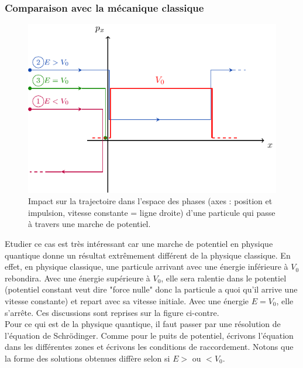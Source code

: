 \subsubsection{Comparaison avec la mécanique classique}
\begin{figure}
  \centering
  \includegraphics[width=.9\linewidth]{images/marche_potentiel_classique.pdf}
  \caption{Impact sur la trajectoire dans l'espace des phases (axes : position et impulsion, vitesse constante = ligne droite) d'une particule qui passe à travers une marche de potentiel.}
  \label{fig:ch2-marche_potentiel_classique}
\end{figure}

Etudier ce cas est très intéressant car une marche de potentiel en physique quantique donne un résultat extrêmement différent de la physique classique. En effet, en physique classique, une particule arrivant avec une énergie inférieure à $V_0$ rebondira. Avec une énergie supérieure à $V_0$, elle sera ralentie dans le potentiel (potentiel constant veut dire "force nulle" donc la particule a quoi qu'il arrive une vitesse constante) et repart avec sa vitesse initiale. Avec une énergie $E= V_0$, elle s'arrête.  Ces discussions sont reprises sur la figure ci-contre. \\

Pour ce qui est de la physique quantique, il faut passer par une résolution de l'équation de Schrödinger. Comme pour le puits de potentiel, écrivons l'équation dans les différentes zones et écrivons les conditions de raccordement. Notons que la forme des solutions obtenues diffère selon si $E>$ ou $< V_0$.
